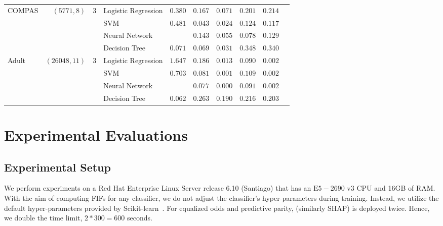 \begin{table}
\begin{tabular}{lrclrrr|rrr}
		\multirow{4}{*}{COMPAS} & \multirow{4}{*}{$ (5771, 8) $} & \multirow{4}{*}{$ 3$} 
		& Logistic Regression & $ 0.380 $  & $ 0.167 $  & $ \mathbf{0.071} $  & $ \mathbf{0.201} $  & $ 0.214 $  \\ 
		& & & SVM & $ 0.481 $  & $ 0.043 $  & $ \mathbf{0.024} $  & $ 0.124 $  & $ \mathbf{0.117} $  \\ 
		& & & Neural Network & \textemdash  & $ 0.143 $  & $ \mathbf{0.055} $  & $ \mathbf{0.078} $  & $ 0.129 $  \\ 
		& & & Decision Tree & $ 0.071 $  & $ 0.069 $  & $ \mathbf{0.031} $  & $ 0.348 $  & $ \mathbf{0.340} $  \\ 
		\midrule
		
		\multirow{4}{*}{Adult} & \multirow{4}{*}{$ (26048, 11) $} & \multirow{4}{*}{$ 3$} 
		& Logistic Regression & $ 1.647 $  & $ 0.186 $  & $ \mathbf{0.013} $  & $ 0.090 $  & $ \mathbf{0.002} $  \\ 
		& & & SVM & $ 0.703 $  & $ 0.081 $  & $ \mathbf{0.001} $  & $ 0.109 $  & $ \mathbf{0.002} $  \\ 
		& & & Neural Network & \textemdash  & $ 0.077 $  & $ \mathbf{0.000} $  & $ 0.091 $  & $ \mathbf{0.002} $  \\ 
		& & & Decision Tree & $ \mathbf{0.062} $  & $ 0.263 $  & $ 0.190 $  & $ 0.216 $  & $ \mathbf{0.203} $  \\ 
		
		
		\bottomrule
	\end{tabular}
\end{table}






\section{Experimental Evaluations}\label{fairness_fairXplainer_sec:additional_experiments}
\subsection{Experimental Setup}
We perform experiments on a Red Hat Enterprise Linux Server release 6.10 (Santiago) that has an $\text{E}5-2690 \text{ v}3$ CPU and 16GB of RAM. With the aim of computing FIFs for any classifier, we do not adjust the classifier's hyper-parameters during training. Instead, we utilize the default hyper-parameters provided by Scikit-learn~\cite{scikit-learn}. For equalized odds and predictive parity, {\fairXplainer}  (similarly SHAP) is deployed twice. Hence, we double the time limit, $ 2*300 = 600 $ seconds.








